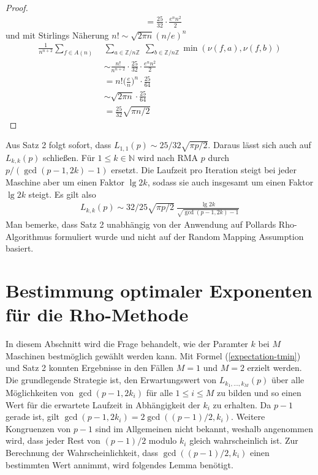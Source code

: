 \documentclass[a4paper, 10pt, ngerman]{article}
\newcommand{\N}{\mathbb{N}}
\newcommand{\Z}{\mathbb{Z}}
\begin{document}
\begin{proof}
\begin{align*}
         & = \frac {25} {32} \cdot \frac {e^n n^2} {2}
    \end{align*}
    und mit Stirlings Näherung $n! \sim \sqrt{2\pi n} (n/e)^n$
    \begin{align*}
        \frac 1 {n^{n + 2}} \sum_{f \in A(n)} \;
         & \sum_{a \in \Z/n\Z} \; \sum_{b \in \Z/n\Z} \min(\nu(f, a), \nu(f, b))    \\
         & \sim \frac {n!}{n^{n + 2}} \cdot \frac {25} {32} \cdot \frac {e^n n^2} 2 \\
         & = n! \bigg (\frac {e} {n} \bigg )^n \cdot \frac {25} {64}                \\
         & \sim \sqrt {2 \pi n} \cdot \frac {25}{64}                                \\
         & = \frac {25} {32} \sqrt{\pi n/2}
    \end{align*}
\end{proof}

\noindent Aus Satz 2 folgt sofort, dass $L_{1, 1}(p) \sim 25/32 \sqrt{\pi p / 2}$. Daraus lässt sich auch auf $L_{k, k}(p)$ schließen. Für $1 \le k \in \N$ wird nach RMA $p$ durch $p/(\gcd(p - 1, 2k) - 1)$ ersetzt. Die Laufzeit pro Iteration steigt bei jeder Maschine aber um einen Faktor $\lg 2k$, sodass sie auch insgesamt um einen Faktor $\lg 2k$ steigt. Es gilt also
\begin{align}
    L_{k, k}(p) \sim 32 / 25 \sqrt{\pi p /2} \ \frac {\lg 2k} {\sqrt{\gcd(p - 1, 2k) - 1}} \label{lkkp}
\end{align}
Man bemerke, dass Satz 2 unabhängig von der Anwendung auf Pollards Rho-Algorithmus formuliert wurde und nicht auf der Random Mapping Assumption basiert.

\section{Bestimmung optimaler Exponenten für die Rho-Methode}\label{sec:optimal-k}

In diesem Abschnitt wird die Frage behandelt, wie der Paramter $k$ bei $M$ Maschinen bestmöglich gewählt werden kann. Mit Formel (\ref{expectation-tmin}) und Satz 2 konnten Ergebnisse in den Fällen $M = 1$ und $M = 2$ erzielt werden. Die grundlegende Strategie ist, den Erwartungswert von $L_{k_1, \dots, k_M}(p)$ über alle Möglichkeiten von $\gcd(p - 1, 2k_i)$ für alle $1 \le i \le M$ zu bilden und so einen Wert für die erwartete Laufzeit in Abhängigkeit der $k_i$ zu erhalten. Da $p - 1$ gerade ist, gilt $\gcd(p-1, 2k_i) = 2\gcd((p - 1)/2, k_i)$. Weitere Kongruenzen von $p - 1$ sind im Allgemeinen nicht bekannt, weshalb angenommen wird, dass jeder Rest von $(p- 1)/2$ modulo $k_i$ gleich wahrscheinlich ist. Zur Berechnung der Wahrscheinlichkeit, dass $\gcd((p - 1)/2, k_i)$ einen bestimmten Wert annimmt, wird folgendes Lemma benötigt.
\end{document}
